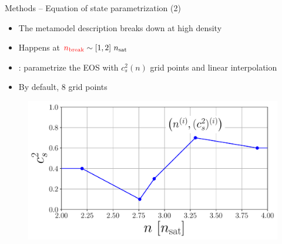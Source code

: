 \documentclass[usenames,dvipsnames,t]{beamer}
\begin{document}
\begin{frame}{Methods -- Equation of state parametrization (2)}

  \def\x{3mm}
  \def\y{1mm}
    
  \begin{itemize}
    \item The metamodel description breaks down at high density~\cite{Biswas:2020puz}

    \vspace{\x}

    \item Happens at $\textcolor{red}{n_{\rm{break}}} \sim [1, 2] \ n_{\rm{sat}}$

    \vspace{\x}
    
    \item {}: parametrize the EOS with $c_s^2(n)$ grid points and linear interpolation~\cite{Somasundaram:2021clp}
    
    \vspace{\x}
    
    \item By default, $8$ grid points
  \end{itemize}
  
  \vspace{\y}

  \begin{figure}
    \centering
    \includegraphics[width=0.65\linewidth]{Figures/cs2_sketch.pdf}
  \end{figure}
\end{frame}
\end{document}
